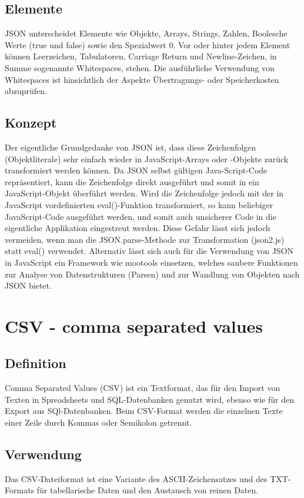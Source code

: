 	\subsection{Elemente}
		JSON unterscheidet Elemente wie Objekte, Arrays, Strings, Zahlen, Boolesche Werte (true und false) sowie den Spezialwert 0. Vor oder hinter jedem Element können Leerzeichen, Tabulatoren, Carriage Return und Newline-Zeichen, in Summe sogenannte Whitespaces, stehen. Die ausführliche Verwendung von Whitespaces ist hinsichtlich der Aspekte Übertragungs- oder Speicherkosten abzuprüfen.
	\subsection{Konzept}
		Der eigentliche Grundgedanke von JSON ist, dass diese Zeichenfolgen (Objektliterale) sehr einfach wieder in JavaScript-Arrays oder -Objekte zurück transformiert werden können. Da JSON selbst gültigen Java-Script-Code repräsentiert, kann die Zeichenfolge direkt ausgeführt und somit in ein JavaScript-Objekt überführt werden. Wird die Zeichenfolge jedoch mit der in JavaScript vordefinierten eval()-Funktion transformiert, so kann beliebiger JavaScript-Code ausgeführt werden, und somit auch unsicherer Code in die eigentliche Applikation eingestreut werden. Diese Gefahr lässt sich jedoch vermeiden, wenn man die JSON.parse-Methode zur Transformation (json2.js) statt eval() verwendet. Alternativ lässt sich auch für die Verwendung von JSON in JavaScript ein Framework wie mootools einsetzen, welches saubere Funktionen zur Analyse von Datenstrukturen (Parsen) und zur Wandlung von Objekten nach JSON bietet.
	
\section{CSV - comma separated values}
	\subsection{Definition}
		Comma Separated Values (CSV) ist ein Textformat, das für den Import von Texten in Spreadsheets und SQL-Datenbanken genutzt wird, ebenso wie für den Export aus SQl-Datenbanken. Beim CSV-Format werden die einzelnen Texte einer Zeile durch Kommas oder Semikolon getrennt.
	\subsection{Verwendung}
		Das CSV-Dateiformat ist eine Variante des ASCII-Zeichensatzes und des TXT-Formats für tabellarische Daten und den Austausch von reinen Daten.
		



